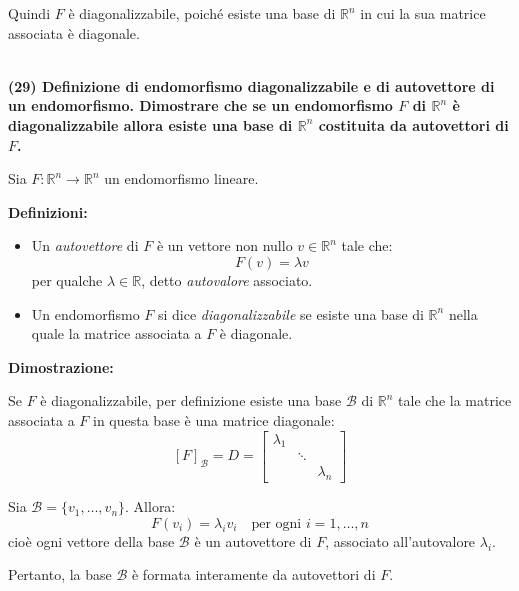 \documentclass[10pt]{extarticle}
\begin{document}
Quindi \( F \) è diagonalizzabile, poiché esiste una base di \( \mathbb{R}^n \) in cui la sua matrice associata è diagonale.

\hfill \\
\textbf{(29) Definizione di endomorfismo diagonalizzabile e di autovettore di un endomorfismo. Dimostrare che se un endomorfismo \( F \) di \( \mathbb{R}^n \) è diagonalizzabile allora esiste una base di \( \mathbb{R}^n \) costituita da autovettori di \( F \).}

Sia \( F : \mathbb{R}^n \to \mathbb{R}^n \) un endomorfismo lineare.

\textbf{Definizioni:}
\begin{itemize}
    \item Un \emph{autovettore} di \( F \) è un vettore non nullo \( v \in \mathbb{R}^n \) tale che:
    \[
    F(v) = \lambda v
    \]
    per qualche \( \lambda \in \mathbb{R} \), detto \emph{autovalore} associato.
    
    \item Un endomorfismo \( F \) si dice \emph{diagonalizzabile} se esiste una base di \( \mathbb{R}^n \) nella quale la matrice associata a \( F \) è diagonale.
\end{itemize}

\textbf{Dimostrazione:}

Se \( F \) è diagonalizzabile, per definizione esiste una base \( \mathcal{B} \) di \( \mathbb{R}^n \) tale che la matrice associata a \( F \) in questa base è una matrice diagonale:
\[
[F]_{\mathcal{B}} = D = \begin{bmatrix}
\lambda_1 & & \\
& \ddots & \\
& & \lambda_n
\end{bmatrix}
\]

Sia \( \mathcal{B} = \{v_1, \dots, v_n\} \). Allora:
\[
F(v_i) = \lambda_i v_i \quad \text{per ogni } i = 1, \dots, n
\]
cioè ogni vettore della base \( \mathcal{B} \) è un autovettore di \( F \), associato all'autovalore \( \lambda_i \).

Pertanto, la base \( \mathcal{B} \) è formata interamente da autovettori di \( F \).
\end{document}
